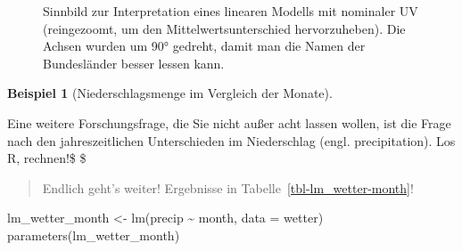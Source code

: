 \documentclass[
  letterpaper,
]{scrbook}
\newenvironment{Shaded}{\begin{snugshade}}{\end{snugshade}}
\newcommand{\AttributeTok}[1]{\textcolor[rgb]{0.40,0.45,0.13}{#1}}
\newcommand{\FunctionTok}[1]{\textcolor[rgb]{0.28,0.35,0.67}{#1}}
\newcommand{\NormalTok}[1]{\textcolor[rgb]{0.00,0.23,0.31}{#1}}
\newcommand{\OtherTok}[1]{\textcolor[rgb]{0.00,0.23,0.31}{#1}}
\newcommand{\SpecialCharTok}[1]{\textcolor[rgb]{0.37,0.37,0.37}{#1}}
\theoremstyle{definition}
\theoremstyle{definition}
\newtheorem{example}{Beispiel}[chapter]
\theoremstyle{definition}
\theoremstyle{remark}
\begin{document}
\begin{figure}


\caption{\label{fig-bin-nom}Sinnbild zur Interpretation eines linearen
Modells mit nominaler UV (reingezoomt, um den Mittelwertsunterschied
hervorzuheben). Die Achsen wurden um 90° gedreht, damit man die Namen
der Bundesländer besser lessen kann.}

\end{figure}%

\begin{example}[Niederschlagsmenge im Vergleich der
Monate]\protect\hypertarget{exm-months}{}\label{exm-months}

Eine weitere Forschungsfrage, die Sie nicht außer acht lassen wollen,
ist die Frage nach den jahreszeitlichen Unterschieden im Niederschlag
(engl. precipitation). Los R, rechnen!\$ \square\$

\end{example}

\begin{quote}
{} Endlich geht's weiter! Ergebnisse in
Tabelle~\ref{tbl-lm_wetter-month}!
\end{quote}

\begin{Shaded}
\begin{Highlighting}[]
\NormalTok{lm\_wetter\_month }\OtherTok{\textless{}{-}} \FunctionTok{lm}\NormalTok{(precip }\SpecialCharTok{\textasciitilde{}}\NormalTok{ month, }\AttributeTok{data =}\NormalTok{ wetter)}
\FunctionTok{parameters}\NormalTok{(lm\_wetter\_month)}
\end{Highlighting}
\end{Shaded}
\end{document}
